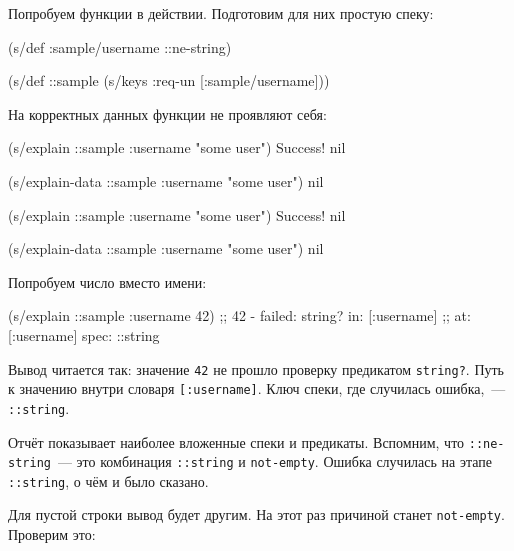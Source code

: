 Попробуем функции в действии. Подготовим для них простую спеку:

\begin{english}
  \begin{clojure}
(s/def :sample/username ::ne-string)

(s/def ::sample
  (s/keys :req-un [:sample/username]))
  \end{clojure}
\end{english}

\noindent
На корректных данных функции не проявляют себя:

\ifx\DEVICETYPE\MOBILE

\begin{english}
  \begin{clojure}
(s/explain ::sample
  {:username "some user"})
Success!
nil

(s/explain-data ::sample
  {:username "some user"})
nil
  \end{clojure}
\end{english}

\else

\begin{english}
  \begin{clojure}
(s/explain ::sample {:username "some user"})
Success!
nil

(s/explain-data ::sample {:username "some user"})
nil
  \end{clojure}
\end{english}

\fi

\noindent
Попробуем число вместо имени:

\begin{english}
  \begin{clojure}
(s/explain ::sample {:username 42})
;; 42 - failed: string? in: [:username]
;; at: [:username] spec: ::string
  \end{clojure}
\end{english}

Вывод читается так: значение \verb|42| не прошло проверку предикатом
\verb|string?|. Путь к значению внутри словаря \verb|[:username]|. Ключ
спеки, где случилась ошибка,~--- \verb|::string|.

Отчёт показывает наиболее вложенные спеки и предикаты. Вспомним, что
\verb|::ne-string|~--- это комбинация \verb|::string| и
\verb|not-empty|. Ошибка случилась на этапе \verb|::string|, о чём и было
сказано.

Для пустой строки вывод будет другим. На этот раз причиной станет
\verb|not-empty|. Проверим это:

